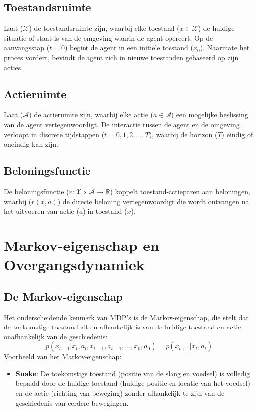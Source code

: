 \documentclass[a4paper,12pt]{report}
\begin{document}
\subsection{Toestandsruimte}
Laat (\(\mathcal{X}\)) de toestandsruimte zijn, waarbij elke toestand (\(x \in
\mathcal{X}\)) de huidige situatie of staat is van de omgeving waarin de agent
opereert. Op de aanvangsstap (\(t = 0\)) begint de agent in een initiële
toestand (\(x_0\)). Naarmate het proces vordert, bevindt de agent zich in
nieuwe toestanden gebaseerd op zijn acties.

\subsection{Actieruimte}
Laat (\(\mathcal{A}\)) de actieruimte zijn, waarbij elke actie (\(a \in
\mathcal{A}\)) een mogelijke beslissing van de agent vertegenwoordigt. De
interactie tussen de agent en de omgeving verloopt in discrete tijdstappen (\(t
= 0, 1, 2, \ldots, T\)), waarbij de horizon (\(T\)) eindig of oneindig kan
zijn.

\subsection{Beloningsfunctie}
De beloningsfunctie (\(r: \mathcal{X} \times \mathcal{A} \to \mathbb{R}\))
koppelt toestand-actieparen aan beloningen, waarbij (\(r(x,a)\)) de directe
beloning vertegenwoordigt die wordt ontvangen na het uitvoeren van actie
(\(a\)) in toestand (\(x\)).

\section{Markov-eigenschap en Overgangsdynamiek}

\subsection{De Markov-eigenschap}
Het onderscheidende kenmerk van MDP's is de Markov-eigenschap, die stelt dat de
toekomstige toestand alleen afhankelijk is van de huidige toestand en actie,
onafhankelijk van de geschiedenis:
\[
    p(x_{t+1}|x_t,a_t,x_{t-1},a_{t-1},\ldots,x_0,a_0) = p(x_{t+1}|x_t,a_t)
\]
Voorbeeld van het Markov-eigenschap:
\begin{itemize}
    \item \textbf{Snake}: De toekomstige toestand (positie van de slang en voedsel) is volledig bepaald door de huidige toestand (huidige positie en locatie van het voedsel) en de actie (richting van beweging) zonder afhankelijk te zijn van de geschiedenis van eerdere bewegingen.
\end{itemize}
\end{document}
